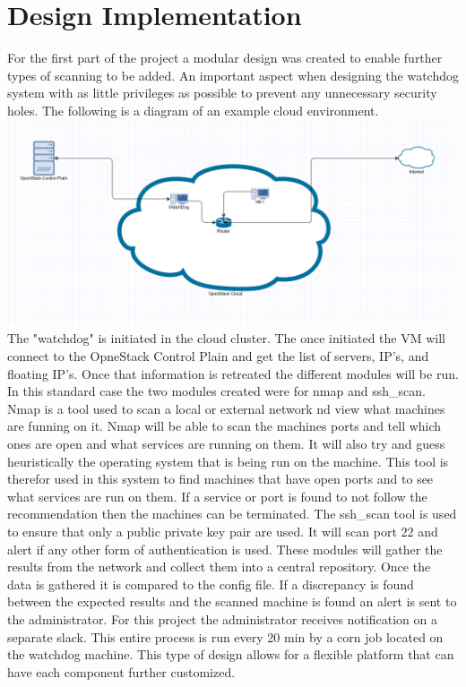 \documentclass[12pt]{article}
\begin{document}
\section{Design Implementation}
For the first part of the project a modular design was created to enable further types of scanning to be added. An important aspect when designing the watchdog system with as little privileges as possible to prevent any unnecessary security holes. The following is a diagram of an example cloud environment.
\\
\includegraphics[scale=.3]{./pic/flowchart.png}
\\
The "watchdog" is initiated in the cloud cluster. The once initiated the VM will connect to the OpneStack Control Plain and get the list of servers, IP's, and floating IP's. Once that information is retreated the different modules will be run. In this standard case the two modules created were for nmap and ssh\_scan. Nmap is a tool used to scan a local or external network nd view what machines are funning on it. Nmap will be able to scan the machines ports and tell which ones are open and what services are running on them. It will also try and guess heuristically the operating system that is being run on the machine. This tool is therefor used in this system to find machines that have open ports and to see what services are run on them. If a service or port is found to not follow the recommendation then the machines can be terminated. The ssh\_scan tool is used to ensure that only a public private key pair are used. It will scan port 22 and alert if any other form of authentication is used.
These modules will gather the results from the network and collect them into a central repository. Once the data is gathered it is compared to the config file.  If a discrepancy is found between the expected results and the scanned machine is found an alert is sent to the administrator. For this project the administrator receives notification on a separate slack. This entire process is run every 20 min by a corn job located on the watchdog machine. This type of design allows for a flexible platform that can have each component further customized.
\end{document}
